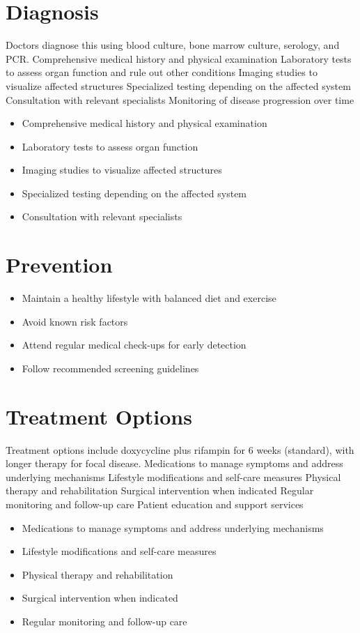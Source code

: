 \section{Diagnosis}
Doctors diagnose this using blood culture, bone marrow culture, serology, and PCR. Comprehensive medical history and physical examination Laboratory tests to assess organ function and rule out other conditions Imaging studies to visualize affected structures Specialized testing depending on the affected system Consultation with relevant specialists Monitoring of disease progression over time

\begin{itemize}[noitemsep]
  \item Comprehensive medical history and physical examination
  \item Laboratory tests to assess organ function
  \item Imaging studies to visualize affected structures
  \item Specialized testing depending on the affected system
  \item Consultation with relevant specialists
\end{itemize}
\section{Prevention}
\begin{itemize}[noitemsep]
  \item Maintain a healthy lifestyle with balanced diet and exercise
  \item Avoid known risk factors
  \item Attend regular medical check-ups for early detection
  \item Follow recommended screening guidelines
\end{itemize}
\section{Treatment Options}
Treatment options include doxycycline plus rifampin for 6 weeks (standard), with longer therapy for focal disease. Medications to manage symptoms and address underlying mechanisms Lifestyle modifications and self-care measures Physical therapy and rehabilitation Surgical intervention when indicated Regular monitoring and follow-up care Patient education and support services

\begin{itemize}[noitemsep]
  \item Medications to manage symptoms and address underlying mechanisms
  \item Lifestyle modifications and self-care measures
  \item Physical therapy and rehabilitation
  \item Surgical intervention when indicated
  \item Regular monitoring and follow-up care
\end{itemize}
